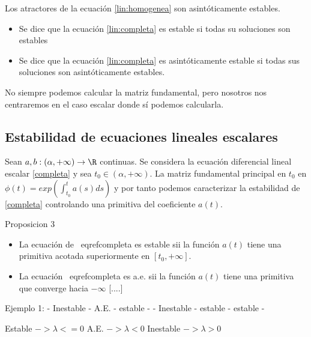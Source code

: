 \begin{ncor}
Los atractores de la ecuación \eqref{lin:homogenea} son asintóticamente estables.
\end{ncor}

\begin{ndef}
\begin{itemize}
\item Se dice que la ecuación \eqref{lin:completa} es estable si todas su soluciones son estables
\item Se dice que la ecuación \eqref{lin:completa} es asintóticamente estable si todas sus soluciones son asintóticamente estables.
\end{itemize}
\end{ndef}

No siempre podemos calcular la matriz fundamental, pero nosotros nos centraremos en el caso escalar donde sí podemos calcularla.

\subsection{Estabilidad de ecuaciones lineales escalares}
Sean $a,b:(\alpha,+\infty)\to \R$ continuas. Se considera la ecuación diferencial lineal escalar \eqref{completa} y sea $t_0\in(\alpha,+\infty)$.
La matriz fundamental principal en $t_0$ en $\phi(t)=exp(\int^t_{t_0} a(s)ds)$ y por tanto podemos caracterizar la estabilidad de \eqref{completa} controlando una primitiva del coeficiente $a(t)$.
\begin{nth}{Proposicion 3}
\begin{itemize}
\item La ecuación de \ eqref{completa} es estable sii la función $a(t)$ tiene una primitiva acotada superiormente en $[t_0,+\infty]$.
\item La ecuación \ eqref{completa} es a.e. sii la función $a(t)$ tiene una primitiva que converge hacia $-\infty$ [....]
\end{itemize}
\end{nth}
Ejemplo 1:
- Inestable
- A.E.
- estable
-
- Inestable
- estable
- estable
-


Estable $-> \lambda <= 0$
A.E. $-> \lambda < 0$
Inestable $-> \lambda > 0$

